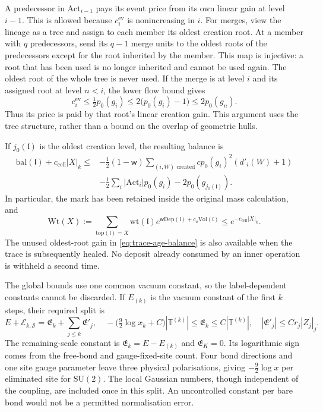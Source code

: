 \documentclass[11pt,letterpaper,reqno]{amsart}
\theoremstyle{definition}
\theoremstyle{remark}
\newcommand{\SU}{\mathrm{SU}}
\begin{document}
A predecessor in \(\mathrm{Act}_{i-1}\) pays its event price
from its own linear gain at level \(i-1\). This is allowed
because \(c_i^{\mathrm{ev}}\) is nonincreasing in \(i\).
For merges, view the lineage as a tree and assign to each
member its oldest creation root. At a member with \(q\)
predecessors, send its \(q-1\) merge units to the oldest
roots of the predecessors except for the root inherited
by the member. This map is injective: a root that has been
used is no longer inherited and cannot be used again.
The oldest root of the whole tree is never used.
If the merge is at level \(i\) and its assigned root at
level \(n<i\), the lower flow bound gives
\[
 c_i^{\mathrm{ev}}
       \le\tfrac12p_0(g_i)
       \le2\bigl(p_0(g_i)-1\bigr)
       \le2p_0(g_n).
\]
Thus its price is paid by that root's linear creation gain.
This argument uses the tree structure, rather than a bound
on the overlap of geometric hulls.

If \(j_0(\mathfrak l)\) is the oldest creation level,
the resulting balance is
\begin{equation}\label{eq:trace-age-balance}
 \begin{split}
 \mathrm{bal}(\mathfrak l)+c_{\mathrm{cell}}|X|_k
 \le{}&
 -\tfrac12(1-\mathsf w)
       \sum_{(i,W)\text{ created}}
            cp_0(g_i)^2(d'_i(W)+1)\\
 &-\tfrac12\sum_i|\mathrm{Act}_i|p_0(g_i)
       -2p_0(g_{j_0(\mathfrak l)}).
 \end{split}
\end{equation}
In particular, the mark has been retained inside the original
mass calculation, and
\begin{equation}\label{eq:trace-top-sum}
 \mathrm{Wt}(X):=
 \sum_{\mathrm{top}(\mathfrak l)=X}
       \mathrm{wt}(\mathfrak l)
       e^{\mathsf w\mathrm{Dep}(\mathfrak l)
                       +c_a\mathrm{Vol}(\mathfrak l)}
 \le e^{-c_{\mathrm{cell}}|X|_k}.
\end{equation}
The unused oldest-root gain in
\eqref{eq:trace-age-balance} is also available when the
trace is subsequently healed. No deposit already consumed
by an inner operation is withheld a second time.

The global bounds use one common vacuum constant,
so the label-dependent constants cannot be
discarded. If $E_{(k)}$ is the vacuum constant of
the first $k$ steps, their required split is
\[
 E+\mathcal E_{k,\mathcal S}
   =\mathfrak E_k+\sum_{j\le k}\mathfrak E'_j,
 \quad
 -\big(\tfrac92\log x_k+C\big)|\mathbb T^{(k)}|
       \le\mathfrak E_k\le C|\mathbb T^{(k)}|,
 \quad
 |\mathfrak E'_j|\le Cr_j|Z_j|_j.
\]
The remaining-scale constant is
$\mathfrak E_k=E-E_{(k)}$ and $\mathfrak E_K=0$.
Its logarithmic sign comes from the free-bond and
gauge-fixed-site count. Four bond directions and
one site gauge parameter leave three physical
polarisations, giving $-\frac92\log x$ per
eliminated site for $\SU(2)$. The local Gaussian
numbers, though independent of the coupling,
are included once in this split. An uncontrolled
constant per bare bond would not be a permitted
normalisation error.
\end{document}
